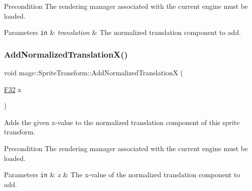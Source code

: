 \begin{DoxyPrecond}{Precondition}
The rendering manager associated with the current engine must be loaded. 
\end{DoxyPrecond}

\begin{DoxyParams}[1]{Parameters}
\mbox{\tt in}  & {\em translation} & The normalized translation component to add. \\
\hline
\end{DoxyParams}
\hypertarget{structmage_1_1_sprite_transform_af766622e394f2ace0e2f999d6c642bb5}{}\label{structmage_1_1_sprite_transform_af766622e394f2ace0e2f999d6c642bb5} 
\subsubsection{\texorpdfstring{Add\+Normalized\+Translation\+X()}{AddNormalizedTranslationX()}}
{\footnotesize\ttfamily void mage\+::\+Sprite\+Transform\+::\+Add\+Normalized\+TranslationX (\begin{DoxyParamCaption}\item[{\hyperlink{namespacemage_aa97e833b45f06d60a0a9c4fc22ae02c0}{F32}}]{x }\end{DoxyParamCaption})}

Adds the given x-\/value to the normalized translation component of this sprite transform.

\begin{DoxyPrecond}{Precondition}
The rendering manager associated with the current engine must be loaded. 
\end{DoxyPrecond}

\begin{DoxyParams}[1]{Parameters}
\mbox{\tt in}  & {\em x} & The x-\/value of the normalized translation component to add. \\
\hline
\end{DoxyParams}
\hypertarget{structmage_1_1_sprite_transform_aea97be812ff2a83bd255d3419354dbe3}{}\label{structmage_1_1_sprite_transform_aea97be812ff2a83bd255d3419354dbe3} 
